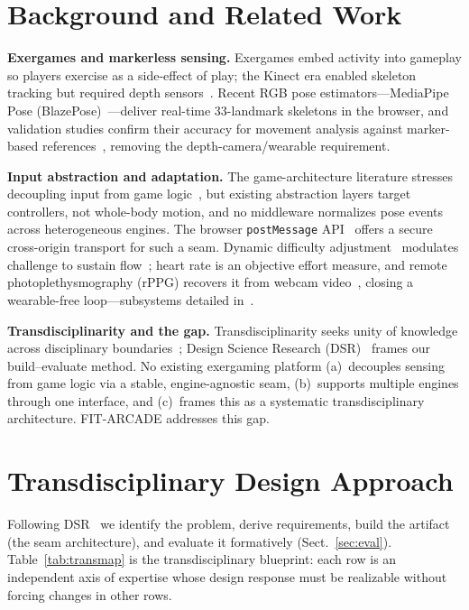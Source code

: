\documentclass[runningheads]{llncs}
\newcommand{\sys}{\textsc{FIT-ARCADE}}
\newcommand{\postmsg}{\texttt{postMessage}}
\newcommand{\citecompanion}{\cite{companion2026}}
\begin{document}
\section{Background and Related Work}\label{sec:related}
\textbf{Exergames and markerless sensing.} Exergames embed activity into gameplay so
players exercise as a side-effect of play; the Kinect era enabled skeleton tracking
but required depth sensors~\cite{sinclair2007considerations}. Recent RGB pose
estimators---MediaPipe Pose (BlazePose)~\cite{bazarevsky2020blazepose}---deliver
real-time 33-landmark skeletons in the browser, and validation studies confirm their
accuracy for movement analysis against marker-based
references~\cite{hii2023mediapipe}, removing the depth-camera/wearable requirement.

\textbf{Input abstraction and adaptation.} The game-architecture literature stresses
decoupling input from game logic~\cite{nystrom2014game}, but existing abstraction
layers target controllers, not whole-body motion, and no middleware normalizes pose
events across heterogeneous engines. The browser \postmsg{} API~\cite{html5postmessage}
offers a secure cross-origin transport for such a seam. Dynamic difficulty
adjustment~\cite{hunicke2005dda} modulates challenge to sustain
flow~\cite{sweetser2005gameflow}; heart rate is an objective effort measure, and
remote photoplethysmography (rPPG) recovers it from webcam
video~\cite{wang2017pos,debnath2025rppg}, closing a wearable-free loop---subsystems
detailed in~\citecompanion{}.

\textbf{Transdisciplinarity and the gap.} Transdisciplinarity seeks unity of knowledge
across disciplinary boundaries~\cite{nicolescu2002manifesto,ertas2010transdisciplinary};
Design Science Research (DSR)~\cite{hevner2004dsr,peffers2007dsrm} frames our
build--evaluate method. No existing exergaming platform (a)~decouples sensing from game
logic via a stable, engine-agnostic seam, (b)~supports multiple engines through one
interface, and (c)~frames this as a systematic transdisciplinary architecture. \sys{}
addresses this gap.

\section{Transdisciplinary Design Approach}\label{sec:approach}
Following DSR~\cite{hevner2004dsr,peffers2007dsrm} we identify the problem, derive
requirements, build the artifact (the seam architecture), and evaluate it formatively
(Sect.~\ref{sec:eval}). Table~\ref{tab:transmap} is the transdisciplinary blueprint:
each row is an independent axis of expertise whose design response must be realizable
without forcing changes in other rows.
\end{document}
